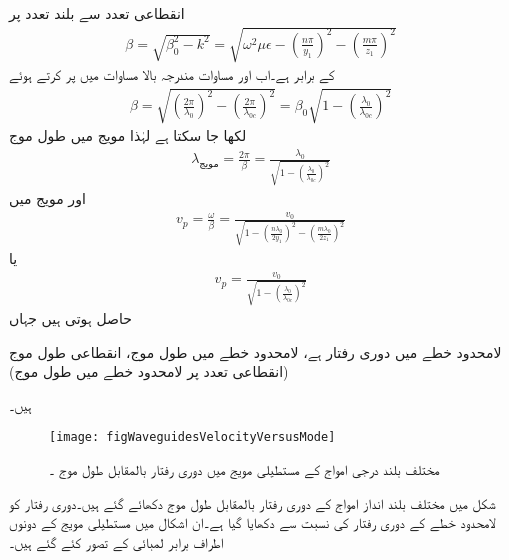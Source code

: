 انقطاعی تعدد سے بلند تعدد   پر
\begin{align}\label{مساوات_مویج_آزاد_اور_قید_زاویائی_مستقل}
\beta=\sqrt{\beta_0^2-k^2}=\sqrt{\omega^2 \mu \epsilon -\left(\frac{n \pi}{y_1}\right)^2-\left(\frac{m \pi}{z_1}\right)^2}
\end{align}
کے برابر ہے۔اب  اور مساوات  مندرجہ بالا مساوات میں پر کرتے ہوئے
\begin{align}
\beta=\sqrt{\left(\frac{2\pi}{\lambda_0}\right)^2-\left(\frac{2\pi}{\lambda_{0c}}\right)^2}=\beta_0 \sqrt{1-\left(\frac{\lambda_0}{\lambda_{0c}}\right)^2}
\end{align}
لکھا جا سکتا ہے لہٰذا  مویج میں طول موج
\begin{align}
\lambda_{\text{مویج}}=\frac{2\pi}{\beta}=\frac{\lambda_0}{\sqrt{1-\left(\frac{\lambda_0}{\lambda_{0c}}\right)^2}}
\end{align}
اور مویج میں  
\begin{align}
v_p =\frac{\omega}{\beta}=\frac{v_0}{\sqrt{1-\left(\frac{n \lambda_0}{2 y_1}\right)^2-\left(\frac{m \lambda_0}{2 z_1}\right)^2}}
\end{align}
یا
\begin{align}
v_p=\frac{v_0}{\sqrt{1-\left(\frac{\lambda_0}{\lambda_{0c}}\right)^2}}
\end{align}
حاصل ہوتی ہیں جہاں
\begin{description}
 لامحدود خطے میں دوری رفتار  ہے،
 لامحدود خطے میں طول موج،
انقطاعی طول موج (انقطاعی تعدد پر لامحدود خطے میں طول موج)
\end{description}
ہیں۔
\begin{figure}
\centering
\texttt{[image: figWaveguidesVelocityVersusMode]}
\caption{مختلف بلند درجی امواج کے مستطیلی مویج میں دوری رفتار بالمقابل طول موج ۔}
\label{شکل_مویج_دوری_رفتار_مختلف_بلند_انداز}
\end{figure}

شکل  میں مختلف بلند انداز امواج  کے دوری رفتار بالمقابل طول موج  دکھائے گئے ہیں۔دوری رفتار کو لامحدود خطے کے دوری رفتار   کی نسبت سے دکھایا گیا ہے۔ان اشکال میں مستطیلی مویج کے دونوں اطراف برابر لمبائی  کے تصور کئے گئے ہیں۔

